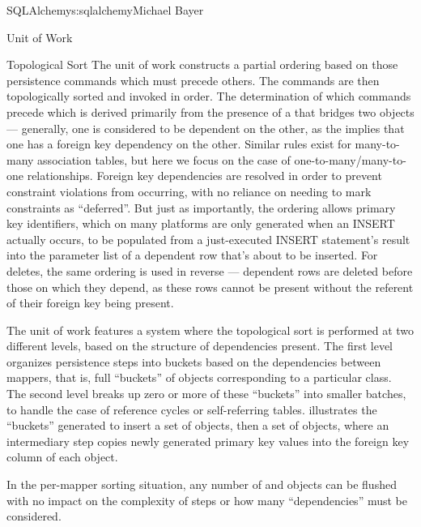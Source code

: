 \begin{aosachapter}{SQLAlchemy}{s:sqlalchemy}{Michael Bayer}
\begin{aosasect1}{Unit of Work}
\begin{aosasect2}{Topological Sort}
The unit of work constructs a partial ordering based on those persistence commands which must precede others.   The
commands are then topologically sorted and invoked in order.
The determination of which commands precede which is derived primarily from the
presence of a  that bridges two  objects — generally, one 
is considered to be dependent on the other, as the  implies that one 
has a foreign key dependency on the other.  Similar rules exist for many-to-many association tables, but here
we focus on the case of one-to-many/many-to-one relationships.   Foreign key dependencies are resolved
in order to prevent constraint violations from occurring, with no reliance on needing to
mark constraints as ``deferred''.   But just as importantly, the ordering allows
primary key identifiers, which on many platforms are only generated when an INSERT actually
occurs, to be populated from a just-executed INSERT statement's result into the parameter
list of a dependent row that's about to be inserted.   For deletes, the same ordering is used
in reverse — dependent rows are deleted before those on which they depend,
as these rows cannot be present without the referent of their foreign key being
present.

The unit of work features a system where the topological sort is
performed at two different levels, based on the structure of dependencies
present. The first level organizes persistence steps into buckets based on the
dependencies between mappers, that is, full ``buckets'' of objects corresponding
to a particular class. The second level breaks up zero or more of these
``buckets'' into smaller batches, to handle the case of reference cycles or
self-referring tables.  illustrates the ``buckets'' generated to insert
a set of  objects, then a set of  objects, where an
intermediary step copies newly generated  primary key values into the
 foreign key column of each  object.


In the per-mapper sorting situation, any number of  and  objects can be flushed
with no impact on the complexity of steps or how many ``dependencies'' must be considered.


\end{aosasect2}
\end{aosasect1}
\end{aosachapter}
